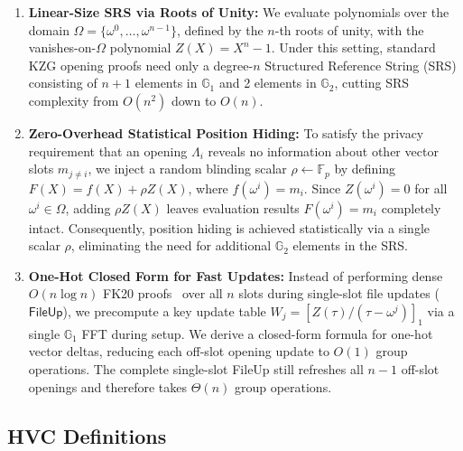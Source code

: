\begin{enumerate}
    \item \textbf{Linear-Size SRS via Roots of Unity:} We evaluate polynomials over the domain $\Omega = \{\omega^0, \dots, \omega^{n-1}\}$, defined by the $n$-th roots of unity, with the vanishes-on-$\Omega$ polynomial $Z(X) = X^n - 1$. Under this setting, standard KZG opening proofs need only a degree-$n$ Structured Reference String (SRS) consisting of $n+1$ elements in $\mathbb{G}_1$ and 2 elements in $\mathbb{G}_2$, cutting SRS complexity from $O(n^2)$ down to $O(n)$.
    \item \textbf{Zero-Overhead Statistical Position Hiding:} To satisfy the privacy requirement that an opening $\Lambda_i$ reveals no information about other vector slots $m_{j\neq i}$, we inject a random blinding scalar $\rho \leftarrow \mathbb{F}_p$ by defining $F(X) = f(X) + \rho Z(X)$, where $f(\omega^i) = m_i$. Since $Z(\omega^i) = 0$ for all $\omega^i \in \Omega$, adding $\rho Z(X)$ leaves evaluation results $F(\omega^i) = m_i$ completely intact. Consequently, position hiding is achieved statistically via a single scalar $\rho$, eliminating the need for additional $\mathbb{G}_2$ elements in the SRS.
    \item \textbf{One-Hot Closed Form for Fast Updates:} Instead of performing dense $O(n \log n)$ FK20 proofs~\cite{FK20} over all $n$ slots during single-slot file updates ($\mathsf{FileUp}$), we precompute a key update table $W_j = [Z(\tau)/(\tau - \omega^j)]_1$ via a single $\mathbb{G}_1$ FFT during setup. We derive a closed-form formula for one-hot vector deltas, reducing each off-slot opening update to $O(1)$ group operations. The complete single-slot FileUp still refreshes all $n-1$ off-slot openings and therefore takes $\Theta(n)$ group operations.
\end{enumerate}

\subsection{HVC Definitions}


